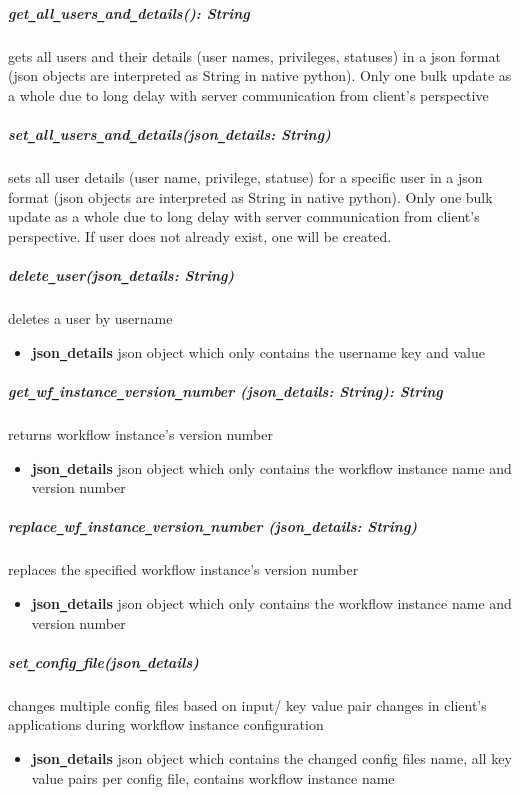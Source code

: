 \subparagraph{get\texttt{\_}all\texttt{\_}users\texttt{\_}and\texttt{\_}details(): String}
gets all users and their details (user names, privileges, statuses) in a json format
(json objects are interpreted as String in native python). Only one bulk update as a whole
due to long delay with server communication from client's perspective


\subparagraph{set\texttt{\_}all\texttt{\_}users\texttt{\_}and\texttt{\_}details(json\texttt{\_}details: String)}
sets all user details (user name, privilege, statuse) for a specific user in a json format
(json objects are interpreted as String in native python). Only one bulk update as a whole
due to long delay with server communication from client's perspective. If user does not already exist, one will be created.

\subparagraph{delete\texttt{\_}user(json\texttt{\_}details: String)}
deletes a user by username
\begin{itemize}
        \item \textbf{json\texttt{\_}details}
        json object which only contains the username key and value
\end{itemize}


\subparagraph{get\texttt{\_}wf\texttt{\_}instance\texttt{\_}version\texttt{\_}number
(json\texttt{\_}details: String): String}
returns workflow instance's version number 
\begin{itemize}
        \item \textbf{json\texttt{\_}details}
        json object which only contains the workflow instance name and version number 
\end{itemize}

\subparagraph{replace\texttt{\_}wf\texttt{\_}instance\texttt{\_}version\texttt{\_}number
(json\texttt{\_}details: String)}
replaces the specified workflow instance's version number 
\begin{itemize}
        \item \textbf{json\texttt{\_}details}
        json object which only contains the workflow instance name and version number
\end{itemize}


\subparagraph{set\texttt{\_}config\texttt{\_}file(json\texttt{\_}details)}
changes multiple config files based on input/ key value pair changes in client's applications during workflow instance 
configuration
\begin{itemize}
        \item \textbf{json\texttt{\_}details}
        json object which contains the changed config files name, 
        all key value pairs per config file, 
        contains workflow instance name
\end{itemize}

